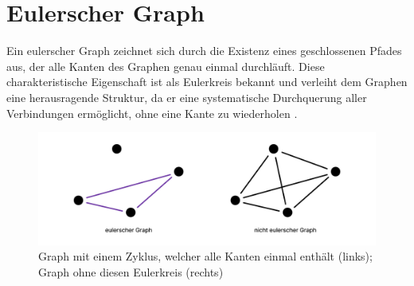 \section{Eulerscher Graph}

Ein eulerscher Graph zeichnet sich durch die Existenz eines geschlossenen Pfades aus, der alle Kanten des Graphen genau einmal durchläuft. Diese charakteristische Eigenschaft ist als Eulerkreis bekannt und verleiht dem Graphen eine herausragende Struktur, da er eine systematische Durchquerung aller Verbindungen ermöglicht, ohne eine Kante zu wiederholen \cite{brandstadt1994eulerkreise,liebling1970euler}.

\begin{figure}
    \centering
    \includegraphics[width=1\textwidth]{content/img/Research/Graphen/EulerscherGraph.png}
    \caption{Graph mit einem Zyklus, welcher alle Kanten einmal enthält (links); Graph ohne diesen Eulerkreis (rechts)}
    \label{fig:eulersche}
\end{figure}
\FloatBarrier